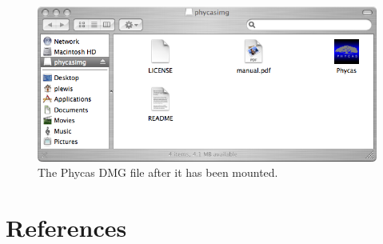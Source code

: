 \documentclass[10pt]{article}
\begin{document}
%
%
\begin{figure}[t]
\begin{center}
\begin{minipage}{5.in}
\hfil\includegraphics[scale=0.5]{images/phycasdmg}\hfil
\caption{\small The Phycas DMG file after it has been mounted.}
\label{phycasdmg}
\end{minipage}
\end{center}
\end{figure}

\clearpage

\section*{References}
\renewcommand{\bibsection}{}


\printindex
\end{document}
